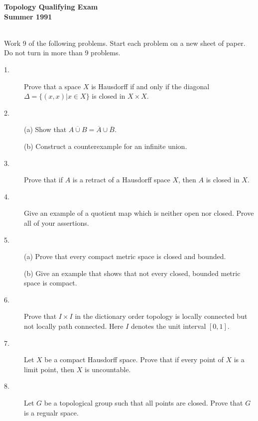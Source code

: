 \documentclass{article}
\begin{document}



\begin{center}\begin{LARGE}
{\bf Topology Qualifying Exam}\\ 
{\bf Summer 1991}\\ \end{LARGE}
\end{center}
\vspace{0.1in}
\noindent\hrulefill\\

Work 9 of the following problems. Start each problem on a new sheet of paper.
Do not turn in more than 9 problems.

\begin{description}
\item[1.]
Prove that a space $X$ is Hausdorff if and only if the diagonal
$\Delta = \{(x,x) |x \in X\}$ is closed in $X \times X$.

\item[2.] (a)
Show that $\overline{A \cup B} = \overline A \cup \overline B$.

\item[\quad] (b)
Construct a counterexample for an infinite union.

\item[3.]
Prove that if $A$ is a retract of a Hausdorff space $X$, then $A$ is closed
in $X$.

\item[4.]
Give an example of a quotient map which is neither open nor closed. Prove all
of your assertions.

\item[5.] (a)
Prove that every compact metric space is closed and bounded.

\item[\quad] (b)
Give an example that shows that not every closed, bounded metric space is
compact.

\item[6.]
Prove that $I \times I$ in the dictionary order topology is locally connected
but not locally path connected. Here $I$ denotes the unit interval
$[0,1]$.

\item[7.]
Let $X$ be a compact Hausdorff space. Prove that if every point of $X$ is a
limit point, then $X$ is uncountable.

\item[8.]
Let $G$ be a topological group such that all points are closed. Prove that
$G$ is a regualr space.


\end{description}
\end{document}
